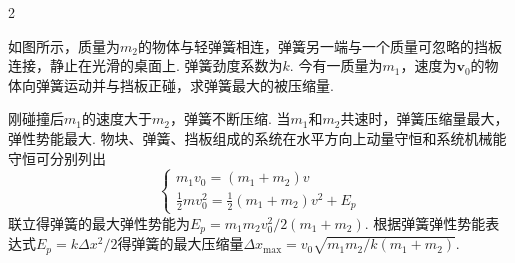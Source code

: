 \begin{paracol}{2}
\begin{problem}
    如图所示，质量为$m_2$的物体与轻弹簧相连，弹簧另一端与一个质量可忽略的挡板连接，静止在光滑的桌面上. 弹簧劲度系数为$k$. 今有一质量为$m_1$，速度为$\bm v_0$的物体向弹簧运动并与挡板正碰，求弹簧最大的被压缩量.
    \switchcolumn\vspace*{\fill}\centering
    \vspace*{\fill}
\end{problem}
\end{paracol}
\begin{solution}
    刚碰撞后$m_1$的速度大于$m_2$，弹簧不断压缩. 当$m_1$和$m_2$共速时，弹簧压缩量最大，弹性势能最大. 物块、弹簧、挡板组成的系统在水平方向上动量守恒和系统机械能守恒可分别列出
    \[\begin{cases}
        m_1v_0=(m_1+m_2)v\\
        \frac12mv_0^2=\frac12(m_1+m_2)v^2+E_p
    \end{cases}\]
    联立得弹簧的最大弹性势能为$E_p=m_1m_2v_0^2/2(m_1+m_2)$. 根据弹簧弹性势能表达式$E_p=k\Delta x^2/2$得弹簧的最大压缩量$\Delta x_{\max}=v_0\sqrt{m_1m_2/k(m_1+m_2)}$.
\end{solution}

